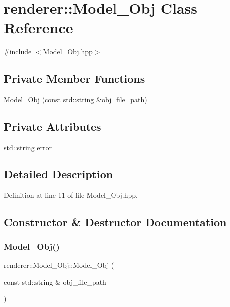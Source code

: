\hypertarget{classrenderer_1_1_model___obj}{}\section{renderer\+::Model\+\_\+\+Obj Class Reference}
\label{classrenderer_1_1_model___obj}


{\ttfamily \#include $<$Model\+\_\+\+Obj.\+hpp$>$}

\subsection*{Private Member Functions}
\begin{DoxyCompactItemize}
\item 
\mbox{\hyperlink{classrenderer_1_1_model___obj_aad3de19e8de8ea13516fc296927bbeaf}{Model\+\_\+\+Obj}} (const std\+::string \&obj\+\_\+file\+\_\+path)
\end{DoxyCompactItemize}
\subsection*{Private Attributes}
\begin{DoxyCompactItemize}
\item 
std\+::string \mbox{\hyperlink{classrenderer_1_1_model___obj_a8c370b89798744d421ade1466f0c9ad1}{error}}
\end{DoxyCompactItemize}


\subsection{Detailed Description}


Definition at line 11 of file Model\+\_\+\+Obj.\+hpp.



\subsection{Constructor \& Destructor Documentation}
\mbox{\label{classrenderer_1_1_model___obj_aad3de19e8de8ea13516fc296927bbeaf}} 
\subsubsection{\texorpdfstring{Model\_Obj()}{Model\_Obj()}}
{\footnotesize\ttfamily renderer\+::\+Model\+\_\+\+Obj\+::\+Model\+\_\+\+Obj (\begin{DoxyParamCaption}\item[{const std\+::string \&}]{obj\+\_\+file\+\_\+path }\end{DoxyParamCaption})\hspace{0.3cm}{\ttfamily [private]}}



